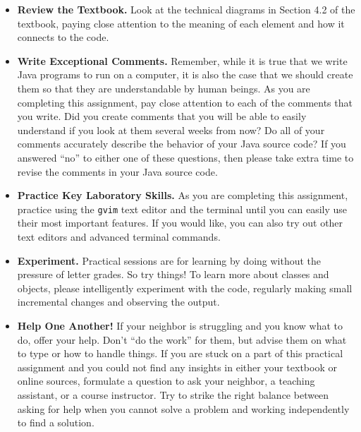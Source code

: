 \documentclass[11pt]{article}
\begin{document}
\vspace*{-.05in}
\begin{itemize}

\item {\bf Review the Textbook.} Look at the technical diagrams in Section 4.2
  of the textbook, paying close attention to the meaning of each element and how
  it connects to the code.

\item {\bf Write Exceptional Comments.} Remember, while it is true that we write
  Java programs to run on a computer, it is also the case that we should create
  them so that they are understandable by human beings. As you are completing
  this assignment, pay close attention to each of the comments that you write.
  Did you create comments that you will be able to easily understand if you look
  at them several weeks from now? Do all of your comments accurately describe
  the behavior of your Java source code? If you answered ``no'' to either one of
  these questions, then please take extra time to revise the comments in your
  Java source code.

\item {\bf Practice Key Laboratory Skills.} As you are completing this
  assignment, practice using the {\tt gvim} text editor and the terminal until
  you can easily use their most important features. If you would like, you can
  also try out other text editors and advanced terminal commands.

\item {\bf Experiment.} Practical sessions are for learning by doing without the
  pressure of letter grades. So try things! To learn more about classes and
  objects, please intelligently experiment with the code, regularly making small
  incremental changes and observing the output.

\item {\bf Help One Another!} If your neighbor is struggling and you know what
  to do, offer your help. Don't ``do the work'' for them, but advise them on
  what to type or how to handle things. If you are stuck on a part of this
  practical assignment and you could not find any insights in either your
  textbook or online sources, formulate a question to ask your neighbor, a
  teaching assistant, or a course instructor. Try to strike the right balance
  between asking for help when you cannot solve a problem and working
  independently to find a solution.

\end{itemize}
\end{document}
